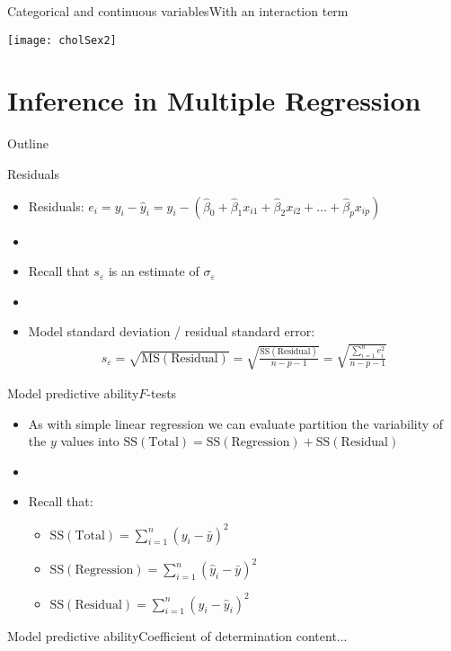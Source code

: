 \documentclass[xcolor=dvipsnames]{beamer}
\begin{document}
\begin{frame}{Categorical and continuous variables}{With an interaction term}
	\begin{center}
		\texttt{[image: cholSex2]}
	\end{center}
\end{frame}

\section{Inference in Multiple Regression}
\begin{frame}{Outline}
	\tableofcontents[currentsection,subsectionstyle=show/shaded/hide]
\end{frame}

\begin{frame}{Residuals}
	\begin{itemize}
		\item Residuals: $e_i = y_i - \hat{y}_i = y_i - \left(\hat{\beta}_0 + \hat{\beta}_1 x_{i1} + \hat{\beta}_2 x_{i2} + \hdots + \hat{\beta}_p x_{ip} \right)$
		\item[]
		\item Recall that $s_{\varepsilon}$ is an estimate of $\sigma_{\varepsilon}$
		\item[]
		\item Model standard deviation / residual standard error:
		\begin{gather*}
			s_{\varepsilon} = \sqrt{\text{MS}(\text{Residual})} = \sqrt{\frac{\text{SS}(\text{Residual})}{n-p-1}} = \sqrt{\frac{\sum_{i=1}^n e_i^2}{n-p-1}}
		\end{gather*}
	\end{itemize}
\end{frame}

\begin{frame}{Model predictive ability}{$F$-tests}
	\begin{itemize}
		\item As with simple linear regression we can evaluate partition the variability of the $y$ values into $\text{SS}(\text{Total}) = \text{SS}(\text{Regression}) + \text{SS}(\text{Residual})$
		\item[]
		\item Recall that:
		\begin{itemize}
			\item $\text{SS}(\text{Total}) = \sum_{i = 1}^n (y_i - \bar{y})^2 $
			\item $\text{SS}(\text{Regression}) = \sum_{i = 1}^n (\hat{y}_i - \bar{y})^2 $ 
			\item $\text{SS}(\text{Residual}) = \sum_{i=1}^n (y_i -\hat{y}_i)^2$
		\end{itemize}
	\end{itemize}
\end{frame}

\begin{frame}{Model predictive ability}{Coefficient of determination}
	content...
\end{frame}
\end{document}
